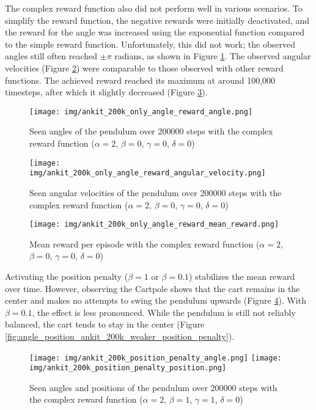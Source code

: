 The complex reward function also did not perform well in various scenarios. To simplify the reward function, the negative rewards were initially deactivated, and the reward for the angle was increased using the exponential function compared to the simple reward function. Unfortunately, this did not work; the observed angles still often reached $\pm\pi$ radians, as shown in Figure \ref{fig:angle_ankit_200k_only_angle_reward}. The observed angular velocities (Figure \ref{fig:angle_velocity_ankit_200k_only_angle_reward}) were comparable to those observed with other reward functions. The achieved reward reached its maximum at around 100,000 timesteps, after which it slightly decreased (Figure \ref{fig:mean_reward_ankit_200k_only_angle_reward}).
\begin{figure}[htbp]
    \centering
    \texttt{[image: img/ankit\_200k\_only\_angle\_reward\_angle.png]}
    \caption{Seen angles of the pendulum over 200000 steps with the complex reward function ($\alpha=2$, $\beta=0$, $\gamma=0$, $\delta=0$)}
    \label{fig:angle_ankit_200k_only_angle_reward}
\end{figure}
\begin{figure}[htbp]
    \centering
    \texttt{[image: img/ankit\_200k\_only\_angle\_reward\_angular\_velocity.png]}
    \caption{Seen angular velocities of the pendulum over 200000 steps with the complex reward function ($\alpha=2$, $\beta=0$, $\gamma=0$, $\delta=0$)}
    \label{fig:angle_velocity_ankit_200k_only_angle_reward}
\end{figure}
\begin{figure}[htbp]
    \centering
    \texttt{[image: img/ankit\_200k\_only\_angle\_reward\_mean\_reward.png]}
    \caption{Mean reward per episode with the complex reward function ($\alpha=2$, $\beta=0$, $\gamma=0$, $\delta=0$)}
    \label{fig:mean_reward_ankit_200k_only_angle_reward}
\end{figure}
Activating the position penalty ($\beta=1$ or $\beta=0.1$) stabilizes the mean reward over time. However, observing the Cartpole shows that the cart remains in the center and makes no attempts to swing the pendulum upwards (Figure \ref{fig:angle_position_ankit_200k_position_penalty}). With $\beta=0.1$, the effect is less pronounced. While the pendulum is still not reliably balanced, the cart tends to stay in the center (Figure \ref{fig:angle_position_ankit_200k_weaker_position_penalty}).
\begin{figure}[htbp]
    \centering
    \texttt{[image: img/ankit\_200k\_position\_penalty\_angle.png]}
    \texttt{[image: img/ankit\_200k\_position\_penalty\_position.png]}
    \caption{Seen angles and positions of the pendulum over 200000 steps with the complex reward function ($\alpha=2$, $\beta=1$, $\gamma=1$, $\delta=0$)}
    \label{fig:angle_position_ankit_200k_position_penalty}
\end{figure}
